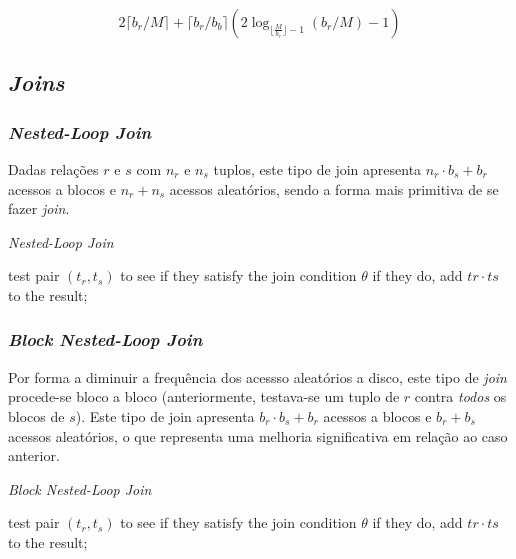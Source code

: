 \documentclass[oneside]{book}
\theoremstyle{definition}
\begin{document}
\[
    2 \lceil b_r /M\rceil + \lceil b_r / b_b \rceil(2 \log_{\lfloor\frac{M}{b_r}\rfloor - 1}(b_r / M) - 1)
\]

\subsection{\textit{Joins}}

\subsubsection*{\textit{Nested-Loop Join}}

Dadas relações $r$ e $s$ com $n_r$ e $n_s$ tuplos, este tipo de join apresenta $n_r \cdot b_s + b_r$ acessos a blocos e $n_r + n_s$ acessos aleatórios, sendo a forma mais primitiva de se fazer \textit{join}.

\begin{algorithm}
    \caption{\textit{Nested-Loop Join}}\label{alg:cap}
    \begin{algorithmic}
        \State test pair $(t_r , t_s)$ to see if they satisfy the join condition $\theta$
        \State if they do, add $tr \cdot ts$ to the result;
        \EndFor
    \EndFor
    \end{algorithmic}
 \end{algorithm}

\subsubsection*{\textit{Block Nested-Loop Join}}

Por forma a diminuir a frequência dos acessso aleatórios a disco, este tipo de \textit{join} procede-se bloco a bloco (anteriormente, testava-se um tuplo de $r$ contra \textit{todos} os blocos de $s$). Este tipo de join apresenta $b_r \cdot b_s + b_r$ acessos a blocos e $b_r + b_s$ acessos aleatórios, o que representa uma melhoria significativa em relação ao caso anterior.

\begin{algorithm}
    \caption{\textit{Block Nested-Loop Join}}\label{alg:cap}
    \begin{algorithmic}
                    \State test pair $(t_r , t_s)$ to see if they satisfy the join condition $\theta$
                    \State if they do, add $tr \cdot ts$ to the result;
                \EndFor
            \EndFor
        \EndFor
    \EndFor
    \end{algorithmic}
 \end{algorithm}
\end{document}
